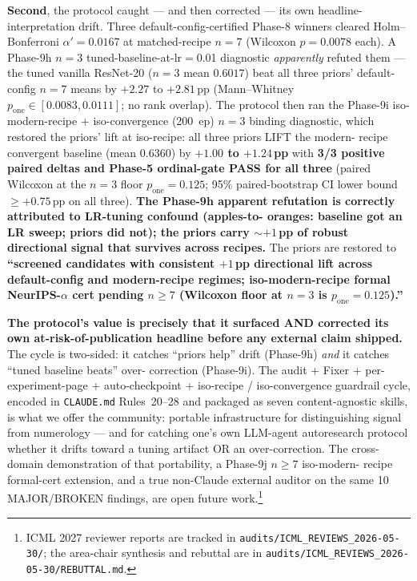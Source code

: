 \documentclass{article}
\begin{document}
\textbf{Second}, the protocol caught --- and then corrected --- its
own headline-interpretation drift. Three default-config-certified
Phase-8 winners cleared Holm--Bonferroni $\alpha'{=}0.0167$ at
matched-recipe $n{=}7$ (Wilcoxon $p{=}0.0078$ each). A Phase-9h $n{=}3$
tuned-baseline-at-lr$=$0.01 diagnostic \emph{apparently} refuted them
--- the tuned vanilla ResNet-20 ($n{=}3$ mean $0.6017$) beat all three
priors' default-config $n{=}7$ means by $+2.27$ to $+2.81$\,pp
(Mann--Whitney $p_{\mathrm{one}} \in [0.0083, 0.0111]$; no rank
overlap). The protocol then ran the Phase-9i iso-modern-recipe +
iso-convergence (200~ep) $n{=}3$ binding diagnostic, which restored
the priors' lift at iso-recipe: all three priors LIFT the modern-
recipe convergent baseline (mean $0.6360$) by \textbf{$+1.00$ to
$+1.24$\,pp} with \textbf{3/3 positive paired deltas and Phase-5
ordinal-gate PASS for all three} (paired Wilcoxon at the $n{=}3$
floor $p_{\mathrm{one}}{=}0.125$; 95\% paired-bootstrap CI lower bound
$\geq +0.75$\,pp on all three). \textbf{The Phase-9h apparent
refutation is correctly attributed to LR-tuning confound (apples-to-
oranges: baseline got an LR sweep; priors did not); the priors carry
$\sim{+1}$\,pp of robust directional signal that survives across
recipes.} The priors are restored to \textbf{``screened candidates
with consistent ${+1}$\,pp directional lift across default-config and
modern-recipe regimes; iso-modern-recipe formal NeurIPS-$\alpha$ cert
pending $n{\geq}7$ (Wilcoxon floor at $n{=}3$ is $p_{\mathrm{one}}{=}
0.125$).''}

\textbf{The protocol's value is precisely that it surfaced AND
corrected its own at-risk-of-publication headline before any external
claim shipped.} The cycle is two-sided: it catches ``priors help''
drift (Phase-9h) \emph{and} it catches ``tuned baseline beats'' over-
correction (Phase-9i). The audit + Fixer + per-experiment-page +
auto-checkpoint + iso-recipe / iso-convergence guardrail cycle,
encoded in \texttt{CLAUDE.md} Rules~20--28 and packaged as seven
content-agnostic skills, is what we offer the community: portable
infrastructure for distinguishing signal from numerology --- and for
catching one's own LLM-agent autoresearch protocol whether it drifts
toward a tuning artifact OR an over-correction. The cross-domain
demonstration of that portability, a Phase-9j $n{\geq}7$ iso-modern-
recipe formal-cert extension, and a true non-Claude external auditor
on the same 10 MAJOR/BROKEN findings, are open future
work.\footnote{ICML 2027 reviewer reports are tracked in
\texttt{audits/ICML\_REVIEWS\_2026-05-30/}; the area-chair synthesis
and rebuttal are in
\texttt{audits/ICML\_REVIEWS\_2026-05-30/REBUTTAL.md}.}
\end{document}
